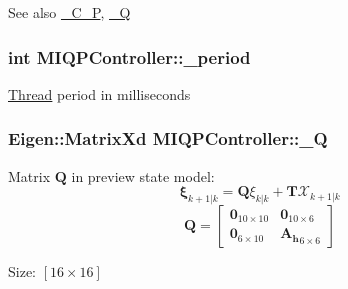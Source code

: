\begin{DoxySeeAlso}{\-See also}
\hyperlink{classMIQPController_a17cf6f8279cf6b2ce333feb9c8fc5a5d}{\-\_\-\-C\-\_\-\-P}, \hyperlink{classMIQPController_ac6404f74d6002d6a0ca4bd2d0b41d548}{\-\_\-\-Q} 
\end{DoxySeeAlso}
\hypertarget{classMIQPController_aed2ce53008e32e64e107398d85e75170}{
\subsubsection[{\-\_\-period}]{\setlength{\rightskip}{0pt plus 5cm}int {\bf \-M\-I\-Q\-P\-Controller\-::\-\_\-period}}}\label{classMIQPController_aed2ce53008e32e64e107398d85e75170}
\hyperlink{classThread}{\-Thread} period in milliseconds \hypertarget{classMIQPController_ac6404f74d6002d6a0ca4bd2d0b41d548}{
\subsubsection[{\-\_\-\-Q}]{\setlength{\rightskip}{0pt plus 5cm}\-Eigen\-::\-Matrix\-Xd {\bf \-M\-I\-Q\-P\-Controller\-::\-\_\-\-Q}}}\label{classMIQPController_ac6404f74d6002d6a0ca4bd2d0b41d548}
\-Matrix $\mathbf{Q}$ in preview state model\-: \[ \mathbf{\xi}_{k+1|k} = \mathbf{Q} \xi_{k|k} + \mathbf{T}\mathcal{X}_{k+1|k} \] \[ \mathbf{Q} = \left[\begin{array}{cc} \mathbf{0}_{10\times10} & \mathbf{0}_{10\times6}\\ \mathbf{0}_{6\times10} & \mathbf{A_h}_{6\times6} \end{array}\right] \]

\-Size\-: $[16\times16]$

